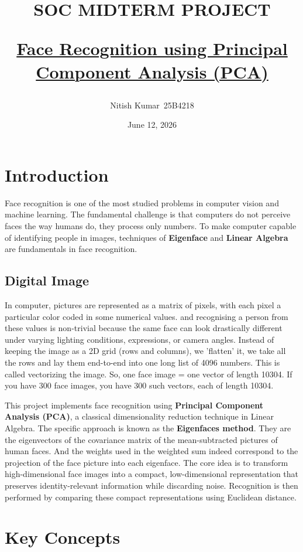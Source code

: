 \documentclass[12pt,a4paper]{article}
\title{ \textbf{SOC MIDTERM PROJECT}

\underline{Face Recognition using Principal Component Analysis (PCA)}}
\author{Nitish Kumar\  25B4218}
\date{June 12, 2026}
\begin{document}
\maketitle

\tableofcontents

\newpage

\section{Introduction}

Face recognition is one of the most studied problems in computer vision and machine learning. 
The fundamental challenge is that computers do not perceive faces the way humans do, they process only numbers. 
To make computer capable of identifying people in images, techniques of \textbf{Eigenface} and \textbf{Linear Algebra}
are fundamentals in face recognition.

 \subsection{Digital Image}
In computer, pictures are represented as a matrix of pixels, 
with each pixel a particular color coded in some numerical values. and recognising a person from these values is non-trivial because 
the same face can look drastically different under varying lighting conditions, expressions, or camera angles.
Instead of keeping the image as a 2D grid (rows and columns), we 'flatten' it, we take all the rows and lay them end-to-end 
into one long list of 4096 numbers. This is called vectorizing the image.
So, one face image = one vector of length 10304.
If you have 300 face images, you have 300 such vectors, each of length 10304.
 
This project implements face recognition using \textbf{Principal Component Analysis (PCA)}, a classical dimensionality reduction technique in
Linear Algebra. 
The specific approach is known as the \textbf{Eigenfaces method}.
They are the eigenvectors of the covariance matrix of the mean-subtracted pictures of human faces. 
And the weights used in the weighted sum indeed correspond to the projection of the face picture into each eigenface.
The core idea is to transform high-dimensional face images into a compact, low-dimensional representation that preserves identity-relevant information while discarding noise. 
Recognition is then performed by comparing these compact representations using Euclidean distance.

\section{Key Concepts}
\end{document}
